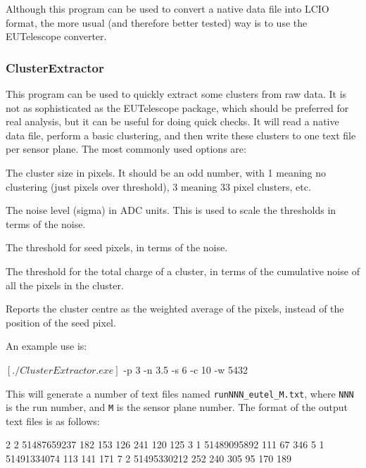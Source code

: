 Although this program can be used to convert a native data file into \gls{LCIO} format,
the more usual (and therefore better tested) way is to use the EUTelescope converter.

\subsubsection{ClusterExtractor}
This program can be used to quickly extract some clusters from raw data.
It is not as sophisticated as the EUTelescope package, which should be preferred for real analysis,
but it can be useful for doing quick checks.
It will read a native data file, perform a basic clustering,
and then write these clusters to one text file per sensor plane.
The most commonly used options are:
\begin{description}
The cluster size in pixels.
It should be an odd number, with 1 meaning no clustering (just pixels over threshold),
3 meaning 3\x{}3 pixel clusters, etc.

The noise level (sigma) in ADC units.
This is used to scale the thresholds in terms of the noise.

The threshold for seed pixels, in terms of the noise.

The threshold for the total charge of a cluster,
in terms of the cumulative noise of all the pixels in the cluster.

Reports the cluster centre as the weighted average of the pixels,
instead of the position of the seed pixel.

\end{description}

An example use is:
\begin{listing}[mybash]
$[./ClusterExtractor.exe]$ -p 3 -n 3.5 -s 6 -c 10 -w 5432
\end{listing}

This will generate a number of text files named \texttt{runNNN\_eutel\_M.txt},
where \texttt{NNN} is the run number, and \texttt{M} is the sensor plane number.
The format of the output text files is as follows:
\begin{listing}[]
2       2       51487659237
 182    153     126
 241    120     125
3       1       51489095892
 111    67      346
5       1       51491334074
 113    141     171
7       2       51495330212
 252    240     305
 95     170     189
\end{listing}

